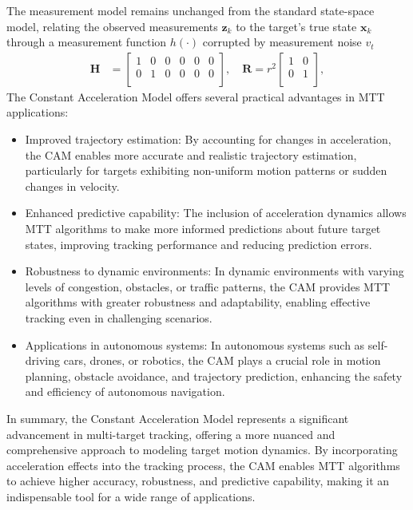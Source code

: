 The measurement model remains unchanged from the standard state-space model, relating the observed measurements $\mathbf{z}_k$ to the target's true state $\mathbf{x}_k$ through a measurement function $h(\cdot)$ corrupted by measurement noise $v_t$
\begin{align}
    \mathbf{H} &=
    \begin{bmatrix}
        1 & 0 & 0 & 0 & 0 & 0 \\
        0 & 1 & 0 & 0 & 0 & 0 \\
    \end{bmatrix},
    \quad \mathbf{R} = r^2
    \begin{bmatrix}
        1 & 0  \\
        0 & 1  \\
    \end{bmatrix},
\end{align}
The Constant Acceleration Model offers several practical advantages in MTT applications:
\begin{itemize}
    \item Improved trajectory estimation: By accounting for changes in acceleration, the CAM enables more accurate
    and realistic trajectory estimation, particularly for targets exhibiting non-uniform motion patterns or sudden changes in velocity.
    \item Enhanced predictive capability: The inclusion of acceleration dynamics allows MTT algorithms to make more
    informed predictions about future target states, improving tracking performance and reducing prediction errors.
    \item Robustness to dynamic environments: In dynamic environments with varying levels of congestion, obstacles,
    or traffic patterns, the CAM provides MTT algorithms with greater robustness and adaptability, enabling effective tracking even in challenging scenarios.
    \item Applications in autonomous systems: In autonomous systems such as self-driving cars, drones, or robotics,
    the CAM plays a crucial role in motion planning, obstacle avoidance, and trajectory prediction, enhancing the safety and efficiency of autonomous navigation.
\end{itemize}
In summary, the Constant Acceleration Model represents a significant advancement in multi-target tracking, offering a
more nuanced and comprehensive approach to modeling target motion dynamics. By incorporating acceleration effects
into the tracking process, the CAM enables MTT algorithms to achieve higher accuracy, robustness, and predictive capability, making it an indispensable tool for a wide range of applications.

